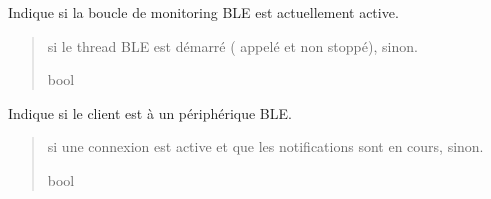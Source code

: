 \documentclass[letterpaper,10pt,french]{sphinxmanual}
\begin{document}
\begin{fulllineitems}
\begin{description}
\end{description}

\begin{fulllineitems}
\label{\detokenize{api/hardware.transports:hardware.transports.ble_client.BleClient.is_running}}
\pysigstartsignatures
\pysigline
{}
\pysigstopsignatures
\sphinxAtStartPar
Indique si la boucle de monitoring BLE est actuellement active.
\begin{quote}\begin{description}
\sphinxAtStartPar
{} si le thread BLE est démarré ( appelé et non stoppé),
 sinon.

\sphinxAtStartPar
bool

\end{description}\end{quote}

\end{fulllineitems}


\begin{fulllineitems}
\label{\detokenize{api/hardware.transports:hardware.transports.ble_client.BleClient.is_connected}}
\pysigstartsignatures
\pysigline
{}
\pysigstopsignatures
\sphinxAtStartPar
Indique si le client est  à un périphérique BLE.
\begin{quote}\begin{description}
\sphinxAtStartPar
{} si une connexion est active et que les notifications
sont en cours,  sinon.

\sphinxAtStartPar
bool

\end{description}\end{quote}


\end{fulllineitems}
\end{fulllineitems}
\end{document}
